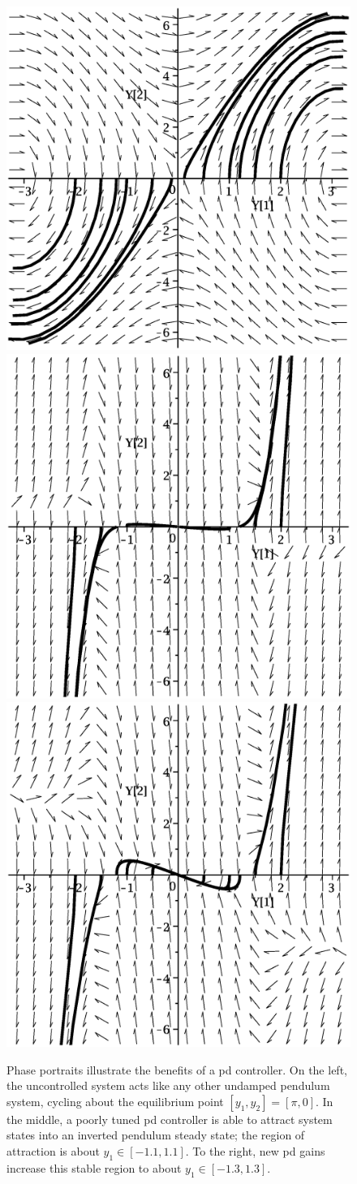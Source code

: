 \begin{figure}

\centering
\includegraphics[width=.3\textwidth-0.1]{img/twip_pp_nctrl.eps}\hfill
\includegraphics[width=.3\textwidth-0.1]{img/twip_pp_pd_3_10.eps}\hfill
\includegraphics[width=.3\textwidth-0.1]{img/twip_pp_pd_5_5.eps}

\caption{Phase portraits illustrate the benefits of a \gls{pd} controller. On the left, the uncontrolled system acts like any other undamped pendulum system, cycling about the equilibrium point $[y_1,y_2] = [\pi, 0]$. In the middle, a poorly tuned \gls{pd} controller is able to attract system states into an inverted pendulum steady state; the region of attraction is about $y_1 \in [-1.1, 1.1]$.   To the right, new \gls{pd} gains increase this stable region to about $y_1 \in [-1.3, 1.3]$.  }
\label{fig:pdtwippp}
\end{figure}

